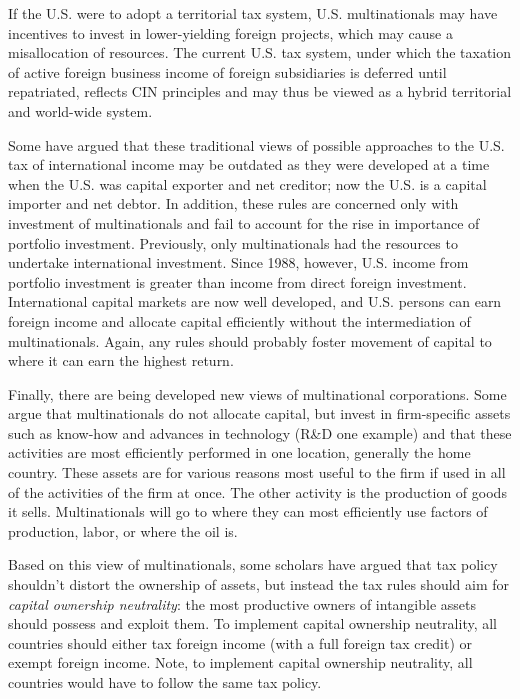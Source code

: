 If the U.S. were to adopt a territorial tax system, U.S. multinationals may have incentives to invest in lower-yielding foreign projects, which may cause a misallocation of resources.  The current U.S. tax system, under which the taxation of active foreign business income of foreign subsidiaries is deferred until repatriated, reflects CIN principles and may thus be viewed as a hybrid territorial and world-wide system.  

Some have argued that these traditional views of possible approaches to the U.S. tax of international income may be outdated as they were developed at a time when the U.S. was capital exporter and net creditor; now the U.S. is a capital importer and net debtor.  In addition, these rules are concerned only with investment of multinationals and fail to account for the rise in importance of portfolio investment.  Previously, only multinationals had the resources to undertake international investment.  Since 1988, however, U.S. income from portfolio investment is greater than income from direct foreign investment.  International capital markets are now well developed, and U.S. persons can earn foreign income and allocate capital efficiently without the intermediation of multinationals.  Again, any rules should probably foster movement of capital to where it can earn the highest return.

Finally, there are being developed new views of multinational corporations.  Some argue that multinationals do not allocate capital, but invest in firm-specific assets  such as know-how and advances in technology (R\&D one example) and that these activities are most efficiently performed in one location, generally the home country.  These assets are for various reasons most useful to the firm if used in all of the activities of the firm at once.  The other activity is the production of goods it sells.  Multinationals will go to where they can most efficiently use factors of production, labor, or where the oil is.

Based on this view of multinationals, some scholars have argued that tax policy shouldn't distort the ownership of assets, but instead the tax rules should aim for \emph{capital ownership neutrality}:  the most productive owners of intangible assets should possess and exploit them.  To implement capital ownership neutrality, all countries should either tax foreign income (with a full foreign tax credit) or exempt foreign income.  Note, to implement capital ownership neutrality, all countries would have to follow the same tax policy.


